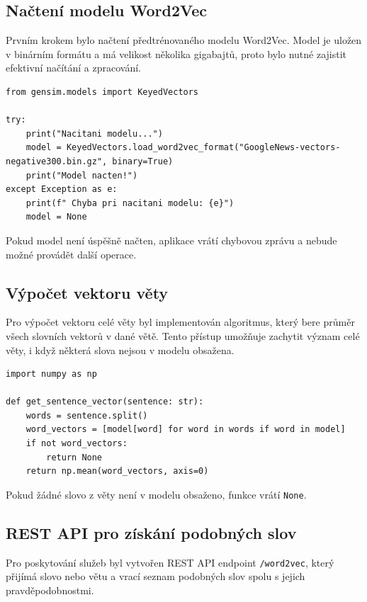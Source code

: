 \documentclass[czech, ba, kiv, he]{fasthesis}
\begin{document}
\subsection{Načtení modelu Word2Vec}

Prvním krokem bylo načtení předtrénovaného modelu Word2Vec. Model je uložen v binárním formátu a má velikost několika gigabajtů, proto bylo nutné zajistit efektivní načítání a zpracování.

\begin{lstlisting}[caption={Načtení modelu Word2Vec}]
from gensim.models import KeyedVectors

try:
    print("Nacitani modelu...")
    model = KeyedVectors.load_word2vec_format("GoogleNews-vectors-negative300.bin.gz", binary=True)
    print("Model nacten!")
except Exception as e:
    print(f" Chyba pri nacitani modelu: {e}")
    model = None
\end{lstlisting}

Pokud model není úspěšně načten, aplikace vrátí chybovou zprávu a nebude možné provádět další operace.

\subsection{Výpočet vektoru věty}

Pro výpočet vektoru celé věty byl implementován algoritmus, který bere průměr všech slovních vektorů v dané větě. Tento přístup umožňuje zachytit význam celé věty, i když některá slova nejsou v modelu obsažena.

\begin{lstlisting}[caption={Výpočet vektoru věty}]
import numpy as np

def get_sentence_vector(sentence: str):
    words = sentence.split()
    word_vectors = [model[word] for word in words if word in model]
    if not word_vectors:
        return None  
    return np.mean(word_vectors, axis=0) 
\end{lstlisting}

Pokud žádné slovo z věty není v modelu obsaženo, funkce vrátí \texttt{None}.

\subsection{REST API pro získání podobných slov}

Pro poskytování služeb byl vytvořen REST API endpoint \texttt{/word2vec}, který přijímá slovo nebo větu a vrací seznam podobných slov spolu s jejich pravděpodobnostmi.
\end{document}
